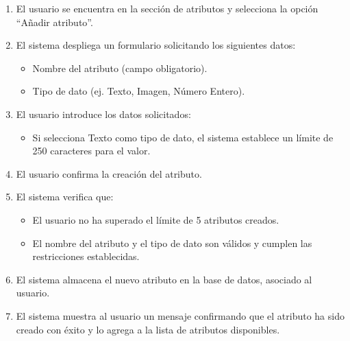 \begin{enumerate}
    \item El usuario se encuentra en la sección de atributos y selecciona la opción \enquote{Añadir atributo}.
    \item El sistema despliega un formulario solicitando los siguientes datos:
    \begin{itemize}
        \item Nombre del atributo (campo obligatorio).
        \item Tipo de dato (ej. Texto, Imagen, Número Entero).
    \end{itemize}
    \item El usuario introduce los datos solicitados:
    \begin{itemize}
        \item Si selecciona Texto como tipo de dato, el sistema establece un límite de 250 caracteres para el valor.
    \end{itemize}
    \item El usuario confirma la creación del atributo.
    \item El sistema verifica que:
    \begin{itemize}
        \item El usuario no ha superado el límite de 5 atributos creados.
        \item El nombre del atributo y el tipo de dato son válidos y cumplen las restricciones establecidas.
    \end{itemize}
    \item El sistema almacena el nuevo atributo en la base de datos, asociado al usuario.
    \item El sistema muestra al usuario un mensaje confirmando que el atributo ha sido creado con éxito y lo agrega a la lista de atributos disponibles.
\end{enumerate}

